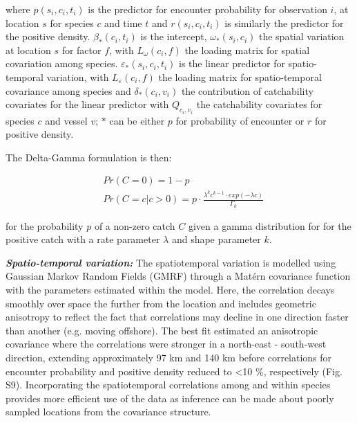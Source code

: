 \documentclass[12pt]{article}
\begin{document}
\begin{linenumbers}
where $p(s_{i}, c_{i}, t_{i})$ is the predictor for encounter probability for
observation $i$, at location $s$ for species $c$ and time $t$ and $r(s_{i},
c_{i}, t_{i})$ is similarly the predictor for the positive density.
$\beta_{*}(c_{i},t_{i})$ is the intercept, $\omega_{*}(s_{i},c_{i})$ the
spatial variation at location $s$ for factor $f$, with $L_{\omega}(c_{i},f)$
the loading matrix for spatial covariation among species.
$\varepsilon_{*}(s_{i},c_{i},t_{i})$ is the linear predictor for
spatio-temporal variation, with $L_{\varepsilon}(c_{i}, f)$ the loading matrix
for spatio-temporal covariance among species and $\delta_{*}(c_{i}, v_{i})$ the
contribution of catchability covariates for the linear predictor with
$Q_{c_{i}, v_{i}}$ the catchability covariates for species $c$ and vessel $v$;
$*$ can be either $p$ for probability of encounter or $r$ for positive density.

The Delta-Gamma formulation is then:

\begin{equation}
	\begin{split}
	& Pr(C = 0) = 1 - p \\
	& Pr(C = c | c > 0) = p \cdot \frac{\lambda^{k}c^{k-1} \cdot exp(-\lambda c)}{\Gamma_{k}}
	\end{split}
\end{equation}

for the probability $p$ of a non-zero catch $C$ given a gamma distribution for
for the positive catch with a rate parameter $\lambda$ and shape parameter $k$.

\textbf{\textit{Spatio-temporal variation:}} The spatiotemporal variation is
modelled using Gaussian Markov Random Fields (GMRF)  through a Matérn covariance function with the
parameters estimated within the model. Here, the correlation decays smoothly
over space the further from the location and includes geometric anisotropy to
reflect the fact that correlations may decline in one direction faster than
another (e.g.  moving offshore)\cite{Thorson2013}.  The best fit estimated an
anisotropic covariance where the correlations were stronger in a north-east -
south-west direction, extending approximately 97 km and 140 km before
correlations for encounter probability and positive density reduced to
\textless 10 \%, respectively (Fig. S9). Incorporating the
spatiotemporal correlations among and within species provides more efficient
use of the data as inference can be made about poorly sampled locations from
the covariance structure.


\end{linenumbers}
\end{document}

